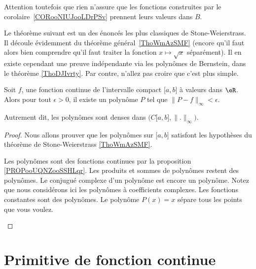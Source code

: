 Attention toutefois que rien n'assure que les fonctions construites par le corolaire~\ref{CORooNIUJooLDrPSv} prennent leurs valeurs dans \( B\).

Le théorème suivant est un des énoncés les plus classiques de Stone-Weierstrass. Il découle évidemment du théorème général~\ref{ThoWmAzSMF} (encore qu'il faut alors bien comprendre qu'il faut traiter la fonction \( x\mapsto \sqrt{x}\) séparément). Il en existe cependant une preuve indépendante via les polynômes de Bernstein, dans le théorème \ref{ThoDJIvrty}. Par contre, n'allez pas croire que c'est plus simple.

\begin{theorem}     \label{ThoGddfas}
	Soit \( f\), une fonction continue de l'intervalle compact \( \mathopen[ a , b \mathclose]\) à valeurs dans \( \eR\). Alors pour tout \( \epsilon>0\), il existe un polynôme \( P\) tel que \( \| P-f \|_{\infty}<\epsilon\).

	Autrement dit, les polynômes sont denses dans \(\big(  C\mathopen[ a , b \mathclose],\| . \|_{\infty}\big)\).
\end{theorem}

\begin{proof}
	Nous allons prouver que les polynômes sur \( \mathopen[ a , b \mathclose]\) satisfont les hypothèses du théorème de Stone-Weierstrass \ref{ThoWmAzSMF}.
	\begin{subproof}
		Les polynômes sont des fonctions continues par la proposition \ref{PROPooUQNZooSSHLqr}.
		Les produits et sommes de polynômes restent des polynômes.
		Le conjugué complexe d'un polynôme est encore un polynôme. Notez que nous considérons ici les polynômes à coefficients complexes.
		Les fonctions constantes sont des polynômes.
		Le polynôme \( P(x)=x\) sépare tous les points que vous voulez.
	\end{subproof}
\end{proof}

\section{Primitive de fonction continue}

